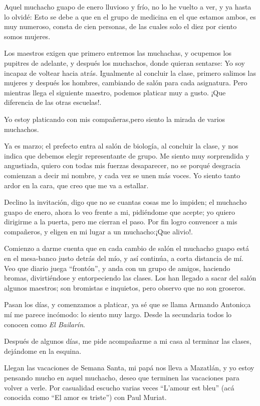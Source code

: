 \documentclass[letterpaper, 12pt]{book}
\begin{document}
Aquel muchacho guapo de enero lluvioso y frío, no lo he vuelto a ver, y ya hasta lo olvidé: Esto se debe a que en el grupo de medicina en el que estamos ambos, es muy numeroso, consta de cien personas, de las cuales solo el diez por ciento somos mujeres.

Los maestros exigen que primero entremos las muchachas, y ocupemos los pupitres de adelante, y después los muchachos, donde quieran sentarse: Yo soy incapaz de voltear hacia atrás. Igualmente al concluir la clase, primero salimos las mujeres y después los hombres, cambiando de salón para cada asignatura. Pero mientras llega el siguiente maestro, podemos platicar muy a gusto. ¡Que diferencia de las otras escuelas!. 

Yo estoy platicando con mis compañeras,pero siento la mirada de varios muchachos.

Ya es marzo; el prefecto entra al salón de biología, al concluir la clase, y nos indica que debemos elegir representante de grupo. Me siento muy sorprendida y angustiada, quiero con todas mis fuerzas desaparecer, no se porqué desgracia comienzan a decir mi nombre, y cada vez se unen más voces. Yo siento tanto ardor en la cara, que creo que me va a estallar.

Declino la invitación, digo que no se cuantas cosas me lo impiden; el muchacho guapo de enero, ahora lo veo frente a mi, pidiéndome que acepte; yo quiero dirigirme a la puerta, pero me cierran el paso. Por fin logro convencer a mis compañeros, y eligen en mi lugar a un muchacho:¡Que alivio!.

Comienzo a darme cuenta que en cada cambio de salón el muchacho guapo está en el mesa-banco justo detrás del mío, y así continúa, a corta distancia de mí. Veo que diario juega ``frontón'', y anda con un grupo de amigos, haciendo bromas, divirtiéndose y entorpeciendo las clases. Los han llegado a sacar del salón algunos maestros; son bromistas e inquietos, pero observo que no son groseros.

Pasan los días, y comenzamos a platicar, ya sé que se llama Armando Antonio;a mí me parece incómodo: lo siento muy largo. Desde la secundaria todos lo conocen como {\it El Bailarín}.

Después de algunos días, me pide acompañarme a mi casa al terminar las clases, dejándome en la esquina. 

Llegan las vacaciones de Semana Santa, mi papá nos lleva a Mazatlán, y yo estoy pensando mucho en aquel muchacho, deseo que terminen las vacaciones para volver a verle. Por casualidad escucho varias veces ``L'amour est bleu'' (acá conocida como ``El amor es triste'') con Paul Muriat. 
\end{document}
